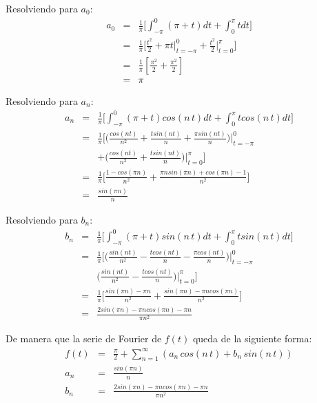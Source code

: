 \documentclass[twocolumn]{article}
\begin{document}
Resolviendo para $a_0$:
\begin{eqnarray*}
a_0 &=& \frac{1}{\pi} \bigg[ \int_{-\pi}^{0}(\pi + t) dt + \int_{0}^{\pi}t dt \bigg]\\
&=& \frac{1}{\pi} \bigg[ \frac{t^{2}}{2} + \pi t\bigg|_{t=-\pi}^{0} + \frac{t^{2}}{2}\bigg|_{t=0}^{\pi} \bigg] \\
&=& \frac{1}{\pi} [\frac{\pi^{2}}{2} + \frac{\pi^{2}}{2}]\\
&=& \pi
\end{eqnarray*}

Resolviendo para $a_n$:
\begin{eqnarray*}
a_n &=& \frac{1}{\pi} \bigg[ \int_{-\pi}^{0}(\pi + t)cos(n\,t) dt + \int_{0}^{\pi}tcos(n\,t) dt \bigg] \\
&=& \frac{1}{\pi} \bigg[ \bigg(\frac{cos(n t)}{n^{2}} + \frac{t sin(n t)}{n} + \frac{\pi sin(n t)}{n}\bigg)\bigg|_{t=-\pi}^{0}\\
& & + \bigg(\frac{cos(nt)}{n^{2}} + \frac{tsin(n t)}{n}\bigg)\bigg|_{t=0}^{\pi} \bigg] \\
&=& \frac{1}{\pi} \bigg[ \frac{1 - cos(\pi n)}{n^{2}}+ \frac{\pi n sin(\pi n)+ cos(\pi n) -1}{n^{2}} \bigg]\\
&=& \frac{sin(\pi n)}{n}
\end{eqnarray*}

Resolviendo para $b_n$:
\begin{eqnarray*}
b_n &=&  \frac{1}{\pi} \bigg[ \int_{-\pi}^{0}(\pi + t)sin(n\,t) dt + \int_{0}^{\pi}tsin(n\,t) dt \bigg] \\
&=&  \frac{1}{\pi} \bigg[ \bigg(\frac{sin(n t)}{n^{2}} - \frac{tcos(n t)}{n} - \frac{\pi cos(n t)}{n}\bigg)\bigg|_{t=-\pi}^{0}\\
& & \bigg(\frac{sin(n t)}{n^{2}} - \frac{tcos(n t)}{n}\bigg)\bigg|_{t=0}^{\pi} \bigg] \\
&=& \frac{1}{\pi} \bigg[ \frac{sin(\pi n)-\pi n}{n^{2}} + \frac{sin(\pi n)-\pi n cos(\pi n)}{n^{2}} \bigg]\\
&=& \frac{2sin(\pi n)-\pi n cos(\pi n) - \pi n}{\pi n^{2}}
\end{eqnarray*}

De manera que la serie de Fourier de $f(t)$ queda de la siguiente forma:
\begin{eqnarray*}
f(t) &=& \frac{\pi}{2} + \sum_{n=1}^\infty\left(a_n\,cos(n\,t)+ b_n\,sin(n\,t)\right)\\
a_n &=&  \frac{sin(\pi n)}{n} \\
b_n &=&   \frac{2sin(\pi n)-\pi n cos(\pi n) - \pi n}{\pi n^{2}}
\end{eqnarray*}
\end{document}

